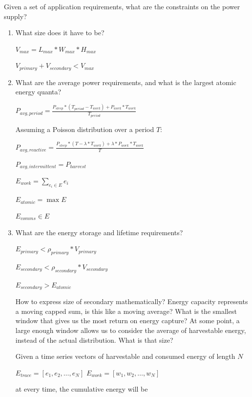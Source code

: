 
Given a set of application requirements, what are the constraints on the power supply?
\begin{enumerate}
\item What size does it have to be?

    $V_{max} = L_{max} * W_{max} * H_{max}$
    
    $V_{primary} + V_{secondary} < V_{max}$
    
\item What are the average power requirements, and what is the largest atomic energy quanta?
    
    $P_{avg, period} = \frac{P_{sleep} * (T_{period} - T_{work}) + P_{work} * T_{work}}{T_{period}}$
    
    Assuming a Poisson distribution over a period $T$:
    
    $P_{avg, reactive} = \frac{P_{sleep} * (T - \lambda * T_{work}) + \lambda * P_{work} * T_{work}}{T}$ 
   
    $P_{avg, intermittent} = P_{harvest}$
    
    $E_{work} = \sum\limits_{e_i\in E} e_i$
    
    $E_{atomic} = \max{E}$
    
    $E_{comms} \in E$
    
    
\item What are the energy storage and lifetime requirements?
    
    $E_{primary} < \rho_{primary} * V_{primary}$
    
    $E_{secondary} < \rho_{secondary} * V_{secondary}$
    
    $E_{secondary} > E_{atomic}$
    
    How to express size of secondary mathematically?
    Energy capacity represents a moving capped sum, is this like a moving average? What is the smallest window that gives us the most return on energy capture?
    At some point, a large enough window allows us to consider the average of harvestable energy, instead of the actual distribution. What is that size?
    
    Given a time series vectors of harvestable and consumed energy of length $N$ 
    
    $E_{trace} = [e_1, e_2, \dots, e_N]$
    $E_{work} =  [w_1, w_2, \dots, w_N]$
    
    at every time, the cumulative energy will be
    

\end{enumerate}
